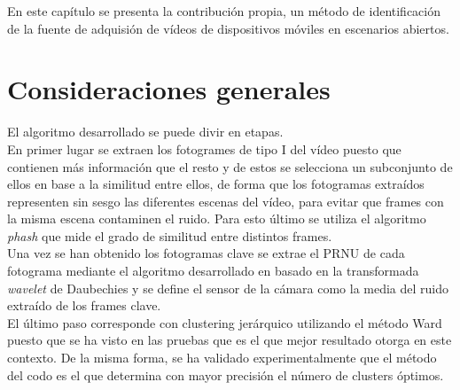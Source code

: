 En este capítulo se presenta la contribución propia, un método de identificación de la fuente de adquisión de vídeos de dispositivos móviles en escenarios abiertos.

\section{Consideraciones generales}
El algoritmo desarrollado se puede divir en etapas. \\

En primer lugar se extraen los fotogrames de tipo I del vídeo puesto que contienen más información que el resto y de estos se selecciona un subconjunto de ellos en base a la similitud entre ellos, de forma que los fotogramas extraídos representen sin sesgo las diferentes escenas del vídeo, para evitar que frames con la misma escena contaminen el ruido. Para esto último se utiliza el algoritmo \textit{phash} que mide el grado de similitud entre distintos frames. \\

Una vez se han obtenido los fotogramas clave se extrae el PRNU de cada fotograma mediante el algoritmo desarrollado en \cite{ana:2015} basado en la transformada \textit{wavelet} de Daubechies y se define el sensor de la cámara como la media del ruido extraído de los frames clave. \\

El último paso corresponde con clustering jerárquico utilizando el método Ward puesto que se ha visto en las pruebas que es el que mejor resultado otorga en este contexto. De la misma forma, se ha validado experimentalmente que el método del codo es el que determina con mayor precisión el número de clusters óptimos. \\

